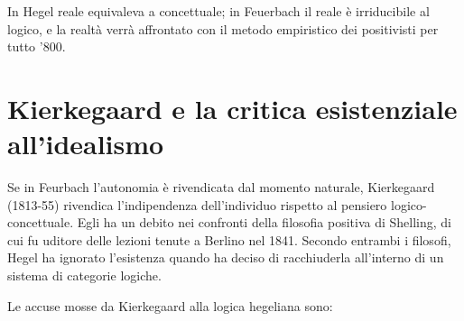 In Hegel reale equivaleva a concettuale; in Feuerbach il reale è irriducibile al logico, e la realtà verrà affrontato con il metodo empiristico dei positivisti per tutto '800.

\section{Kierkegaard e la critica esistenziale all'idealismo}

Se in Feurbach l'autonomia è rivendicata dal momento naturale, Kierkegaard (1813-55) rivendica l'indipendenza dell'individuo rispetto al pensiero logico-concettuale. Egli ha un debito nei confronti della filosofia positiva di Shelling, di cui fu uditore delle lezioni tenute a Berlino nel 1841. Secondo entrambi i filosofi, Hegel ha ignorato l'esistenza quando ha deciso di racchiuderla all'interno di un sistema di categorie logiche.

Le accuse mosse da Kierkegaard alla logica hegeliana sono:

